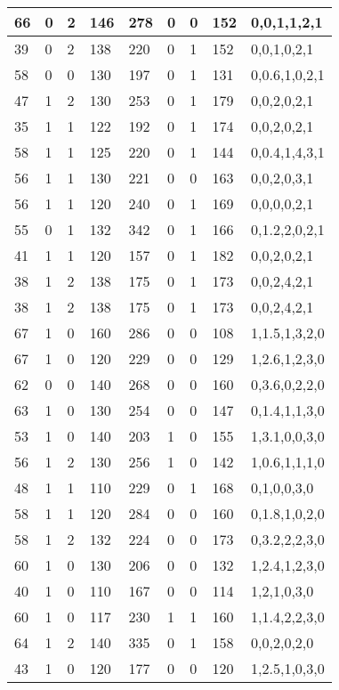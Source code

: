 \documentclass{article}
\begin{document}
\begin{table}[h!]
\begin{tabular}{|l|l|l|l|l|l|l|l|l|}
66 & 0 & 2 & 146 & 278 & 0 & 0 & 152 & 0,0,1,1,2,1 \\ \hline
39 & 0 & 2 & 138 & 220 & 0 & 1 & 152 & 0,0,1,0,2,1 \\ \hline
58 & 0 & 0 & 130 & 197 & 0 & 1 & 131 & 0,0.6,1,0,2,1 \\ \hline
47 & 1 & 2 & 130 & 253 & 0 & 1 & 179 & 0,0,2,0,2,1 \\ \hline
35 & 1 & 1 & 122 & 192 & 0 & 1 & 174 & 0,0,2,0,2,1 \\ \hline
58 & 1 & 1 & 125 & 220 & 0 & 1 & 144 & 0,0.4,1,4,3,1 \\ \hline
56 & 1 & 1 & 130 & 221 & 0 & 0 & 163 & 0,0,2,0,3,1 \\ \hline
56 & 1 & 1 & 120 & 240 & 0 & 1 & 169 & 0,0,0,0,2,1 \\ \hline
55 & 0 & 1 & 132 & 342 & 0 & 1 & 166 & 0,1.2,2,0,2,1 \\ \hline
41 & 1 & 1 & 120 & 157 & 0 & 1 & 182 & 0,0,2,0,2,1 \\ \hline
38 & 1 & 2 & 138 & 175 & 0 & 1 & 173 & 0,0,2,4,2,1 \\ \hline
38 & 1 & 2 & 138 & 175 & 0 & 1 & 173 & 0,0,2,4,2,1 \\ \hline
67 & 1 & 0 & 160 & 286 & 0 & 0 & 108 & 1,1.5,1,3,2,0 \\ \hline
67 & 1 & 0 & 120 & 229 & 0 & 0 & 129 & 1,2.6,1,2,3,0 \\ \hline
62 & 0 & 0 & 140 & 268 & 0 & 0 & 160 & 0,3.6,0,2,2,0 \\ \hline
63 & 1 & 0 & 130 & 254 & 0 & 0 & 147 & 0,1.4,1,1,3,0 \\ \hline
53 & 1 & 0 & 140 & 203 & 1 & 0 & 155 & 1,3.1,0,0,3,0 \\ \hline
56 & 1 & 2 & 130 & 256 & 1 & 0 & 142 & 1,0.6,1,1,1,0 \\ \hline
48 & 1 & 1 & 110 & 229 & 0 & 1 & 168 & 0,1,0,0,3,0 \\ \hline
58 & 1 & 1 & 120 & 284 & 0 & 0 & 160 & 0,1.8,1,0,2,0 \\ \hline
58 & 1 & 2 & 132 & 224 & 0 & 0 & 173 & 0,3.2,2,2,3,0 \\ \hline
60 & 1 & 0 & 130 & 206 & 0 & 0 & 132 & 1,2.4,1,2,3,0 \\ \hline
40 & 1 & 0 & 110 & 167 & 0 & 0 & 114 & 1,2,1,0,3,0 \\ \hline
60 & 1 & 0 & 117 & 230 & 1 & 1 & 160 & 1,1.4,2,2,3,0 \\ \hline
64 & 1 & 2 & 140 & 335 & 0 & 1 & 158 & 0,0,2,0,2,0 \\ \hline
43 & 1 & 0 & 120 & 177 & 0 & 0 & 120 & 1,2.5,1,0,3,0 \\ \hline

\end{tabular}
\end{table}
\end{document}

